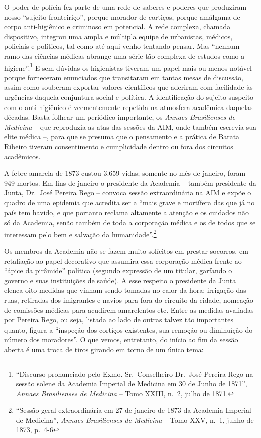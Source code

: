 O poder de polícia fez parte de uma rede de saberes e poderes que
produziram nosso ``sujeito fronteiriço'', porque morador de cortiços,
porque amálgama de corpo anti-higiênico e criminoso em potencial. A rede
complexa, chamada dispositivo, integrou uma ampla e múltipla equipe de
urbanistas, médicos, policiais e políticos, tal como até aqui venho
tentando pensar. Mas ``nenhum ramo das ciências médicas abrange uma
série tão complexa de estudos como a higiene''.\footnote{``Discurso
  pronunciado pelo Exmo. Sr.~Conselheiro Dr.~José Pereira Rego na sessão
  solene da Academia Imperial de Medicina em 30 de Junho de 1871'',
  \emph{Annaes Brasilienses de Medicina} -- Tomo XXIII, n.~2, julho de
  1871.} E sem dúvidas os higienistas tiveram um papel mais ou menos
notável porque forneceram enunciados que transitaram em tantas mesas de
discussão, assim como souberam exportar valores científicos que aderiram
com facilidade às urgências daquela conjuntura social e política. A
identificação do sujeito suspeito com o anti-higiênico é veementemente
repetida na atmosfera acadêmica daquelas décadas. Basta folhear um
periódico importante, os \emph{Annaes Brasilienses de Medicina} -- que
reproduzia as atas das sessões da AIM, onde também escrevia sua elite
médica --, para que se presuma que o pensamento e a prática de Barata
Ribeiro tiveram consentimento e cumplicidade dentro ou fora dos
circuitos acadêmicos.

A febre amarela de 1873 custou 3.659 vidas; somente no mês de janeiro,
foram 949 mortos. Em fins de janeiro o presidente da Academia -- também
presidente da Junta, Dr.~José Pereira Rego -- convoca sessão
extraordinária na AIM e expõe o quadro de uma epidemia que acredita ser
a ``mais grave e mortífera das que já no país tem havido, e que portanto
reclama altamente a atenção e os cuidados não só da Academia, senão
também de toda a corporação médica e os de todos que se interessam pelo
bem e salvação da humanidade''.\footnote{``Sessão geral extraordinária
  em 27 de janeiro de 1873 da Academia Imperial de Medicina'',
  \emph{Annaes Brasilienses de Medicina} -- Tomo XXV, n.~1, junho de
  1873, p.~4-6}

Os membros da Academia não se fazem muito solícitos em prestar socorros,
em retaliação ao papel decorativo que assumira essa corporação médica
frente ao ``ápice da pirâmide'' política (segundo expressão de um
titular, garfando o governo e suas instituições de saúde). A esse
respeito o presidente da Junta elenca oito medidas que vinham sendo
tomadas no calor da hora: irrigação das ruas, retiradas dos imigrantes e
navios para fora do circuito da cidade, nomeação de comissões médicas
para acudirem amarelentos etc. Entre as medidas avaliadas por Pereira
Rego, ou seja, listada ao lado de outras talvez tão importantes quanto,
figura a ``inspeção dos cortiços existentes, sua remoção ou diminuição
do número dos moradores''. O que vemos, entretanto, do início ao fim da
sessão aberta é uma troca de tiros girando em torno de um único tema:

